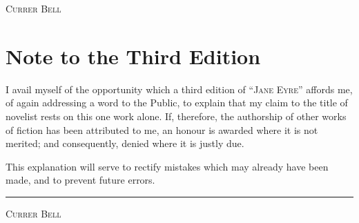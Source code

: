 {\textit{} \hfill \textsc{Currer Bell}}

\chapter{Note to the Third Edition}

I avail myself of the opportunity which a third edition of \enquote{\textsc{Jane
		Eyre}} affords me, of again addressing a word to the Public, to explain
that my claim to the title of novelist rests on this one work alone.
If, therefore, the authorship of other works of fiction has been
attributed to me, an honour is awarded where it is not merited; and
consequently, denied where it is justly due.

This explanation will serve to rectify mistakes which may already have
been made, and to prevent future errors.

\plainbreak{2}

{\textit{} \hfill \textsc{Currer Bell}}
